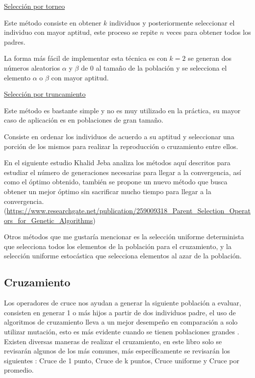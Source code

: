 \documentclass[11pt,fleqn]{book} %
\begin{document}
\underline{Selección por torneo}

Este método consiste en obtener $k$ individuos y posteriormente seleccionar el individuo con mayor aptitud, este proceso se repite $n$ veces para obtener todos los padres.

La forma más fácil de implementar esta técnica es con $k=2$ se generan dos números aleatorios $\alpha$ y $\beta$ de 0 al tamaño de la población y se selecciona el elemento $\alpha$ o $\beta$  con mayor aptitud.

\underline{Selección por truncamiento}

Este método es bastante simple y no es muy utilizado en la práctica, su mayor caso de aplicación es en poblaciones de gran tamaño.

Consiste en ordenar los individuos de acuerdo a su aptitud y seleccionar una porción de los mismos para realizar la reproducción o cruzamiento entre ellos.

En el siguiente estudio Khalid Jeba \cite{SELECTION} analiza los métodos aquí descritos para estudiar el número de generaciones necesarias para llegar a la convergencia, así como el óptimo obtenido, también se propone un nuevo método que busca obtener un mejor óptimo sin sacrificar mucho tiempo para llegar a la convergencia. (\url{https://www.researchgate.net/publication/259009318_Parent_Selection_Operators_for_Genetic_Algorithms})


Otros métodos que me gustaría mencionar es la selección uniforme determinista que selecciona todos los elementos de la población para el cruzamiento, y la selección uniforme estocástica que selecciona elementos al azar de la población.

\subsection{Cruzamiento}

Los operadores de cruce nos ayudan a generar la siguiente población a evaluar, consisten en generar 1 o más hijos a partir de dos individuos padre, el uso de algoritmos de cruzamiento lleva a un mejor desempeño en comparación a solo utilizar mutación, esto es más evidente cuando se tienen poblaciones grandes \cite{CROSSOVER_Spears}. Existen diversas maneras de realizar el cruzamiento, en este libro solo se revisarán algunos de los más comunes, más específicamente se revisarán los siguientes \cite{CROSSOVER_REVIEW}: Cruce de 1 punto, Cruce de k puntos, Cruce uniforme y Cruce por promedio.
\end{document}
